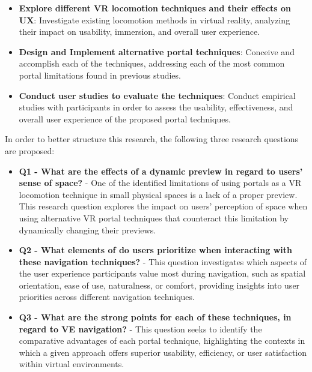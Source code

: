 \begin{itemize}

    \item \textbf{Explore different \gls{VR} locomotion techniques and their effects on \gls{UX}}:
    Investigate existing locomotion methods in virtual reality, analyzing their impact on usability, immersion, and overall user experience.

    \item \textbf{Design and Implement alternative portal techniques}:
    Conceive and accomplish each of the techniques, addressing each of the most common portal limitations found in previous studies.

    \item \textbf{Conduct user studies to evaluate the techniques}: 
    Conduct empirical studies with participants in order to assess the usability, effectiveness, and overall user experience of the proposed portal techniques.
    
\end{itemize}

In order to better structure this research, the following three research questions are proposed:

\begin{itemize}
    \item \textbf{Q1 - What are the effects of a dynamic preview in regard to users' sense of space?} - 
    One of the identified limitations of using portals as a \gls{VR} locomotion technique in small physical spaces is a lack of a proper 
    preview. This research question explores the impact on users' perception of space when using alternative \gls{VR} portal techniques 
    that counteract this limitation by dynamically changing their previews.

     \item \textbf{Q2 - What elements of  do users prioritize when interacting with these navigation techniques?} - 
    This question investigates which aspects of the user experience participants value most during navigation, such as spatial 
    orientation, ease of use, naturalness, or comfort, providing insights into user priorities across different navigation techniques.

    \item \textbf{Q3 - What are the strong points for each of these techniques, in regard to \gls{VE} navigation?} - 
    This question seeks to identify the comparative advantages of each portal technique, highlighting the contexts in which 
    a given approach offers superior usability, efficiency, or user satisfaction within virtual environments.
\end{itemize}

